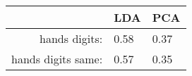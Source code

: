 \begin{tabular}{|r|l|l|}
  \hline
    & LDA & PCA \\
  \hline
  hands digits: & 0.58 & 0.37 \\
  \hline
  hands digits same: & 0.57 & 0.35 \\
  \hline
\end{tabular}
